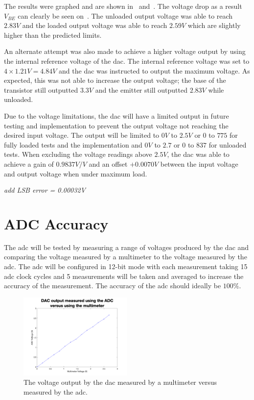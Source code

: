The results were graphed and are shown in~ and~.
The voltage drop as a result $V_{BE}$ can clearly be seen on~.
The unloaded output voltage was able to reach $2.83V$ and the loaded output voltage was able to reach $2.59V$ which are slightly higher than the predicted limits.

An alternate attempt was also made to achieve a higher voltage output by using the internal reference voltage of the \gls{dac}.
The internal reference voltage was set to $4 \times 1.21V = 4.84V$ and the \gls{dac} was instructed to output the maximum voltage.
As expected, this was not able to increase the output voltage; the base of the transistor still outputted $3.3V$ and the emitter still outputted $2.83V$ while unloaded.

Due to the voltage limitations, the \gls{dac} will have a limited output in future testing and implementation to prevent the output voltage not reaching the desired input voltage.
The output will be limited to $0V$ to $2.5V$ or $0$ to $775$ for fully loaded tests and the implementation and $0V$ to $2.7$ or $0$ to $837$ for unloaded tests.
When excluding the voltage readings above $2.5V$, the \gls{dac} was able to achieve a gain of $0.9837V/V$ and an offset $+0.0070V$ between the input voltage and output voltage when under maximum load. 

\textit{add LSB error = 0.00032V}

\section{ADC Accuracy}\label{sec:adc-accuracy}

The \gls{adc} will be tested by measuring a range of voltages produced by the \gls{dac} and comparing the voltage measured by a multimeter to the voltage measured by the \gls{adc}.
The \gls{adc} will be configured in 12-bit mode with each measurement taking 15 \gls{adc} clock cycles and 5 measurements will be taken and averaged to increase the accuracy of the measurement.
The accuracy of the \gls{adc} should ideally be $100\%$.

\begin{figure}[!ht]
    \centering
    \includegraphics[width=0.5\textwidth]{Figures/Testing/ADC}
    \caption{The voltage output by the \gls{dac} measured by a multimeter versus measured by the \gls{adc}.}
    \label{fig:adc-accuracy} %
\end{figure}

